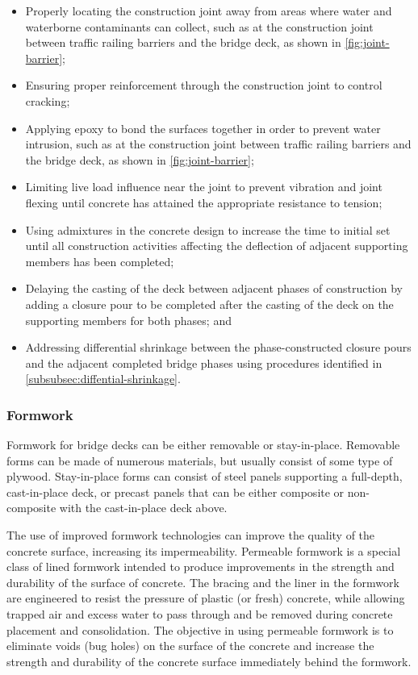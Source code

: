 \begin{itemize}
  \item Properly locating the construction joint away from areas where water and waterborne contaminants can collect, such as at the construction joint between traffic railing barriers and the bridge deck, as shown in \cref{fig:joint-barrier};
  \item Ensuring proper reinforcement through the construction joint to control cracking;
  \item Applying epoxy to bond the surfaces together in order to prevent water intrusion, such as at the construction joint between traffic railing barriers and the bridge deck, as shown in \cref{fig:joint-barrier};
  \item Limiting live load influence near the joint to prevent vibration and joint flexing until concrete has attained the appropriate resistance to tension;
  \item Using admixtures in the concrete design to increase the time to initial set until all construction activities affecting the deflection of adjacent supporting members has been completed;
  \item Delaying the casting of the deck between adjacent phases of construction by adding a closure pour to be completed after the casting of the deck on the supporting members for both phases; and
  \item Addressing differential shrinkage between the phase-constructed closure pours and the adjacent completed bridge phases using procedures identified in \cref{subsubsec:diffential-shrinkage}.
\end{itemize}


\subsubsection{Formwork}
Formwork for bridge decks can be either removable or stay-in-place. Removable forms can be made of numerous materials, but usually consist of some type of plywood. Stay-in-place forms can consist of steel panels supporting a full-depth, cast-in-place deck, or precast panels that can be either composite or non-composite with the cast-in-place deck above.

The use of improved formwork technologies can improve the quality of the concrete surface, increasing its impermeability. Permeable formwork is a special class of lined formwork intended to produce improvements in the strength and durability of the surface of concrete. The bracing and the liner in the formwork are engineered to resist the pressure of plastic (or fresh) concrete, while allowing trapped air and excess water to pass through and be removed during concrete placement and consolidation. The objective in using permeable formwork is to eliminate voids (bug holes) on the surface of the concrete and increase the strength and durability of the concrete surface immediately behind the formwork.

